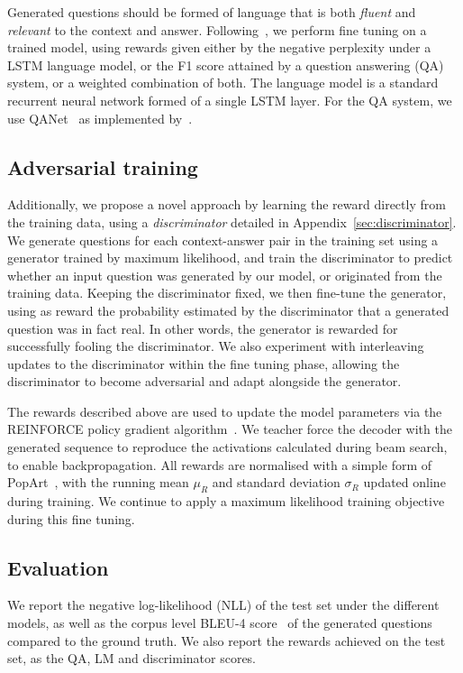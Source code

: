 \documentclass[11pt,a4paper]{article}
\begin{document}
Generated questions should be formed of language that is both \textit{fluent} and \textit{relevant} to the context and answer. Following~\citep{Maluuba}, we perform fine tuning on a trained model, using rewards given either by the negative perplexity under a LSTM language model, or the F1 score attained by a question answering (QA) system, or a weighted combination of both. The language model is a standard recurrent neural network formed of a single LSTM layer. For the QA system, we use QANet~\cite{Yu2018} as implemented by~\citet{QANetGithub}.

\subsection{Adversarial training}
Additionally, we propose a novel approach by learning the reward directly from the training data, using a \textit{discriminator} detailed in Appendix~\ref{sec:discriminator}. We generate questions for each context-answer pair in the training set using a generator trained by maximum likelihood, and train the discriminator to predict whether an input question was generated by our model, or originated from the training data. Keeping the discriminator fixed, we then fine-tune the generator, using as reward the probability estimated by the discriminator that a generated question was in fact real. In other words, the generator is rewarded for successfully fooling the discriminator. We also experiment with interleaving updates to the discriminator within the fine tuning phase, allowing the discriminator to become adversarial and adapt alongside the generator.

The rewards described above are used to update the model parameters via the REINFORCE policy gradient algorithm~\cite{Williams1992}. We teacher force the decoder with the generated sequence to reproduce the activations calculated during beam search, to enable backpropagation. All rewards are normalised with a simple form of PopArt~\cite{VanHasselt}, with the running mean $\mu_R$ and standard deviation $\sigma_R$ updated online during training. We continue to apply a maximum likelihood training objective during this fine tuning.

\subsection{Evaluation}

We report the negative log-likelihood (NLL) of the test set under the different models, as well as the corpus level BLEU-4 score~\cite{Papineni} of the generated questions compared to the ground truth. We also report the rewards achieved on the test set, as the QA, LM and discriminator scores.
\end{document}
